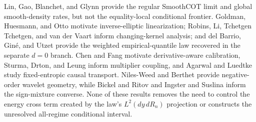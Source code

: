 Lin, Gao, Blanchet, and Glynn provide the regular SmoothCOT limit and global smooth-density rates, but not the equality-local conditional frontier. Goldman, Huesmann, and Otto motivate inverse-elliptic linearization; Robins, Li, Tchetgen Tchetgen, and van der Vaart inform changing-kernel analysis; and del Barrio, Gin\'e, and Utzet provide the weighted empirical-quantile law recovered in the separate \(d=0\) branch. Chen and Fang motivate derivative-aware calibration, Sturma, Drton, and Leung inform multiplier coupling, and Agarwal and Luedtke study fixed-entropic causal transport. Niles-Weed and Berthet provide negative-order wavelet geometry, while Bickel and Ritov and Ingster and Suslina inform the sign-mixture converse. None of these results removes the need to control the energy cross term created by the law's \(L^2(dy\,dR_n)\) projection or constructs the unresolved all-regime conditional interval.